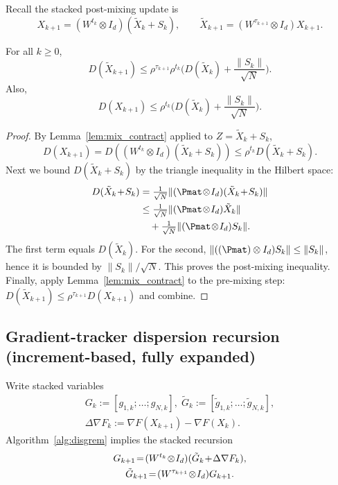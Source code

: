 \documentclass[review,onefignum,onetabnum]{siamart171218}
\begin{document}
	Recall the stacked post-mixing update is
	\[
	X_{k+1}=(W^{t_k}\otimes I_d)(\tilde X_k+S_k),
	\qquad
	\tilde X_{k+1}=(W^{\tau_{k+1}}\otimes I_d)X_{k+1}.
	\]
	\begin{lemma}\label{lem:DX_rec}
		For all $k\ge0$,
		\[
		D(\tilde X_{k+1})
		\le \rho^{\tau_{k+1}}\rho^{t_k}\Big(D(\tilde X_k)+\frac{\|S_k\|}{\sqrt N}\Big).
		\]
		Also,
		\[
		D(X_{k+1})
		\le \rho^{t_k}\Big(D(\tilde X_k)+\frac{\|S_k\|}{\sqrt N}\Big).
		\]
	\end{lemma}
	\begin{proof}
		By Lemma~\ref{lem:mix_contract} applied to $Z=\tilde X_k+S_k$,
		\[
		D(X_{k+1})=D((W^{t_k}\otimes I_d)(\tilde X_k+S_k))\le \rho^{t_k}D(\tilde X_k+S_k).
		\]
		Next we bound $D(\tilde X_k+S_k)$ by the triangle inequality in the Hilbert space:
		\begin{align*}
			D(\tilde X_k\!+\!S_k)
			&=\tfrac1{\sqrt N}\|(\Pmat\!\otimes\! I_d)(\tilde X_k\!+\!S_k)\|\\
			&\le \tfrac1{\sqrt N}\|(\Pmat\!\otimes\! I_d)\tilde X_k\|\\
			&\quad+\tfrac1{\sqrt N}\|(\Pmat\!\otimes\! I_d)S_k\|.
		\end{align*}
		The first term equals $D(\tilde X_k)$.
		For the second, $\|((\Pmat)\otimes I_d)S_k\|\le \|S_k\|$, hence it is bounded by $\|S_k\|/\sqrt N$.
		This proves the post-mixing inequality.
		Finally, apply Lemma~\ref{lem:mix_contract} to the pre-mixing step:
		$D(\tilde X_{k+1})\le \rho^{\tau_{k+1}}D(X_{k+1})$ and combine.
	\end{proof}
	
	\subsection{Gradient-tracker dispersion recursion (increment-based, fully expanded)}
	
	Write stacked variables
	\begin{gather*}
		G_k:=[g_{1,k};\dots;g_{N,k}],\;
		\tilde G_k:=[\tilde g_{1,k};\dots;\tilde g_{N,k}],\\
		\Delta\nabla F_k:=\nabla F(X_{k+1})-\nabla F(X_k).
	\end{gather*}
	Algorithm~\ref{alg:disgrem} implies the stacked recursion
	\begin{gather}
		G_{k+1}\!=\!(W^{t_k}\!\otimes\! I_d)(\tilde G_k\!+\!\Delta\nabla F_k),\label{eq:G_update_stack}\\
		\tilde G_{k+1}\!=\!(W^{\tau_{k+1}}\!\otimes\! I_d)G_{k+1}.\notag
	\end{gather}
	
\end{document}
